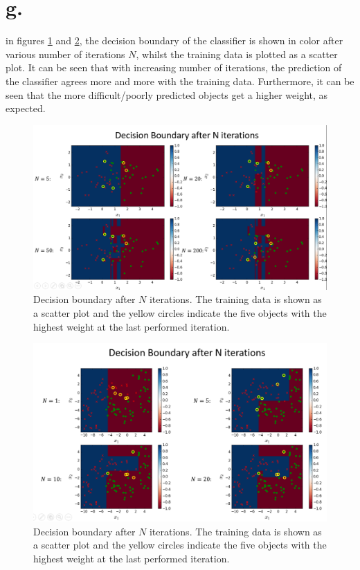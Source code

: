 \documentclass [a4paper] {report}
\begin{document}
	\section*{g.}
	in figures \ref{decision_boundary1} and \ref{decision_boundary2}, the decision boundary of the classifier is shown in color after various number of iterations $N$, whilst the training data is plotted as a scatter plot. It can be seen that with increasing number of iterations, the prediction of the classifier agrees more and more with the training data. Furthermore, it can be seen that the more difficult/poorly predicted objects get a higher weight, as expected.
	
	\begin{figure}[H]
		\includegraphics[width = \textwidth]{Images/decision_boundary.png}
		\caption{Decision boundary after $N$ iterations. The training data is shown as a scatter plot and the yellow circles indicate the five objects with the highest weight at the last performed iteration. }
		\label{decision_boundary1}
	\end{figure}

	\begin{figure}[H]
		\includegraphics[width = \textwidth]{Images/decision_boundary2.png}
		\caption{Decision boundary after $N$ iterations. The training data is shown as a scatter plot and the yellow circles indicate the five objects with the highest weight at the last performed iteration.}
		\label{decision_boundary2}
	\end{figure}
\end{document}
